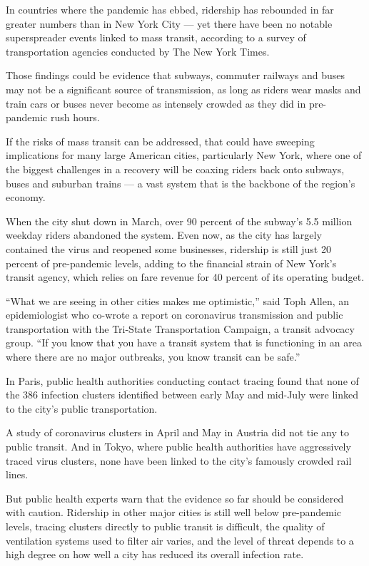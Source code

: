 In countries where the pandemic has ebbed, ridership has rebounded in
far greater numbers than in New York City --- yet there have been no
notable superspreader events linked to mass transit, according to a
survey of transportation agencies conducted by The New York Times.

Those findings could be evidence that subways, commuter railways and
buses may not be a significant source of transmission, as long as riders
wear masks and train cars or buses never become as intensely crowded as
they did in pre-pandemic rush hours.

If the risks of mass transit can be addressed, that could have sweeping
implications for many large American cities, particularly New York,
where one of the biggest challenges in a recovery will be coaxing riders
back onto subways, buses and suburban trains --- a vast system that is
the backbone of the region's economy.

When the city shut down in March, over 90 percent of the subway's 5.5
million weekday riders abandoned the system. Even now, as the city has
largely contained the virus and reopened some businesses, ridership is
still just 20 percent of pre-pandemic levels, adding to the financial
strain of New York's transit agency, which relies on fare revenue for 40
percent of its operating budget.

``What we are seeing in other cities makes me optimistic,'' said Toph
Allen, an epidemiologist who co-wrote a report on coronavirus
transmission and public transportation with the Tri-State Transportation
Campaign, a transit advocacy group. ``If you know that you have a
transit system that is functioning in an area where there are no major
outbreaks, you know transit can be safe.''

In Paris, public health authorities conducting contact tracing found
that none of the 386 infection clusters identified between early May and
mid-July were linked to the city's public transportation.

A study of coronavirus clusters in April and May in Austria did not tie
any to public transit. And in Tokyo, where public health authorities
have aggressively traced virus clusters, none have been linked to the
city's famously crowded rail lines.

But public health experts warn that the evidence so far should be
considered with caution. Ridership in other major cities is still well
below pre-pandemic levels, tracing clusters directly to public transit
is difficult, the quality of ventilation systems used to filter air
varies, and the level of threat depends to a high degree on how well a
city has reduced its overall infection rate.

